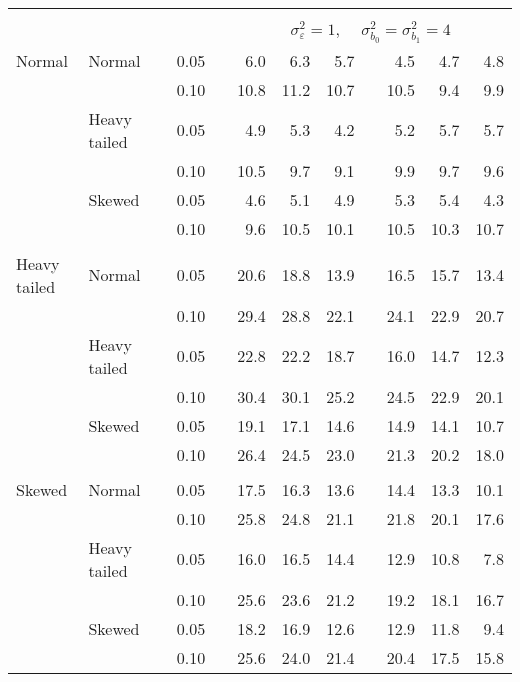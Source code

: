 \begin{table}[ht]
\begin{scriptsize}
\begin{tabular}{ll p{.1cm} c p{.1cm} rrr p{.1cm} rrr}
&&&&&&&&&&&\\
& && && \multicolumn{7}{c}{$\sigma_{\varepsilon}^2 = 1$, \ \ $\sigma_{b_0}^2 = \sigma_{b_1}^2 = 4$} \\ \cline{6-12}
\rowcolor{gray!20} Normal & Normal &  & 0.05 &  & 6.0 & 6.3 & 5.7 &  & 4.5 & 4.7 & 4.8 \\ 
\rowcolor{gray!20}   &  &  & 0.10 &  & 10.8 & 11.2 & 10.7 &  & 10.5 & 9.4 & 9.9 \\ 
\rowcolor{gray!20}   & Heavy tailed &  & 0.05 &  & 4.9 & 5.3 & 4.2 &  & 5.2 & 5.7 & 5.7 \\ 
\rowcolor{gray!20}   &  &  & 0.10 &  & 10.5 & 9.7 & 9.1 &  & 9.9 & 9.7 & 9.6 \\ 
\rowcolor{gray!20}   & Skewed &  & 0.05 &  & 4.6 & 5.1 & 4.9 &  & 5.3 & 5.4 & 4.3 \\ 
\rowcolor{gray!20}   &  &  & 0.10 &  & 9.6 & 10.5 & 10.1 &  & 10.5 & 10.3 & 10.7 \\ 
&&&&&&&&&&&\\
  Heavy tailed & Normal &  & 0.05 &  & 20.6 & 18.8 & 13.9 &  & 16.5 & 15.7 & 13.4 \\ 
   &  &  & 0.10 &  & 29.4 & 28.8 & 22.1 &  & 24.1 & 22.9 & 20.7 \\ 
   & Heavy tailed &  & 0.05 &  & 22.8 & 22.2 & 18.7 &  & 16.0 & 14.7 & 12.3 \\ 
   &  &  & 0.10 &  & 30.4 & 30.1 & 25.2 &  & 24.5 & 22.9 & 20.1 \\ 
   & Skewed &  & 0.05 &  & 19.1 & 17.1 & 14.6 &  & 14.9 & 14.1 & 10.7 \\ 
   &  &  & 0.10 &  & 26.4 & 24.5 & 23.0 &  & 21.3 & 20.2 & 18.0 \\ 
&&&&&&&&&&&\\
  Skewed & Normal &  & 0.05 &  & 17.5 & 16.3 & 13.6 &  & 14.4 & 13.3 & 10.1 \\ 
   &  &  & 0.10 &  & 25.8 & 24.8 & 21.1 &  & 21.8 & 20.1 & 17.6 \\ 
   & Heavy tailed &  & 0.05 &  & 16.0 & 16.5 & 14.4 &  & 12.9 & 10.8 & 7.8 \\ 
   &  &  & 0.10 &  & 25.6 & 23.6 & 21.2 &  & 19.2 & 18.1 & 16.7 \\ 
   & Skewed &  & 0.05 &  & 18.2 & 16.9 & 12.6 &  & 12.9 & 11.8 & 9.4 \\ 
   &  &  & 0.10 &  & 25.6 & 24.0 & 21.4 &  & 20.4 & 17.5 & 15.8 \\ 

\hline
\end{tabular}
\end{scriptsize}
\end{table}


